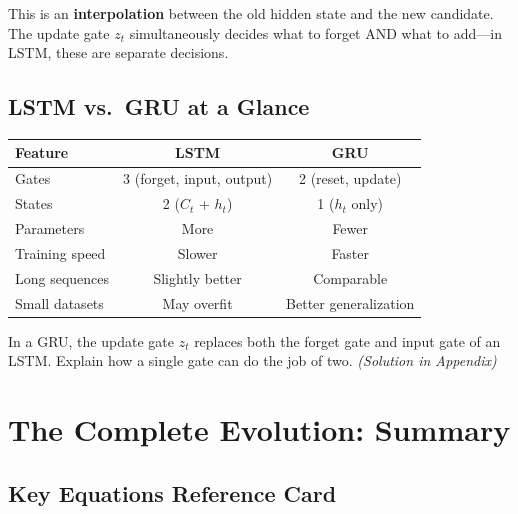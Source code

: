 \documentclass[11pt,a4paper]{article}
\begin{document}
This is an \textbf{interpolation} between the old hidden state and the new candidate. The update gate $z_t$ simultaneously decides what to forget AND what to add---in LSTM, these are separate decisions.

\subsection{LSTM vs.\ GRU at a Glance}

\begin{center}
\renewcommand{\arraystretch}{1.3}
\begin{tabular}{@{}lcc@{}}
\toprule
\textbf{Feature} & \textbf{LSTM} & \textbf{GRU} \\
\midrule
Gates & 3 (forget, input, output) & 2 (reset, update) \\
States & 2 ($C_t$ + $h_t$) & 1 ($h_t$ only) \\
Parameters & More & Fewer \\
Training speed & Slower & Faster \\
Long sequences & Slightly better & Comparable \\
Small datasets & May overfit & Better generalization \\
\bottomrule
\end{tabular}
\end{center}

\begin{tcolorbox}[questionbox={Self-Check Q6}]
In a GRU, the update gate $z_t$ replaces both the forget gate and input gate of an LSTM. Explain how a single gate can do the job of two. \textit{(Solution in Appendix)}
\end{tcolorbox}

\section{The Complete Evolution: Summary}

\subsection{Key Equations Reference Card}
\end{document}
